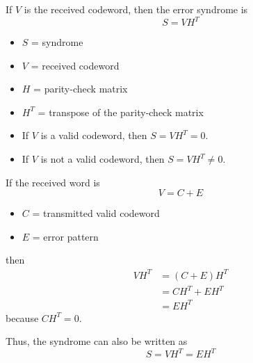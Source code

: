 \documentclass[11pt,a4paper]{book}
\newenvironment{formulabox}[1][Formula]{%
    \begin{tcolorbox}[
        enhanced,
        breakable,
        colback=softcoral!10,
        colframe=softcoral!200,
        title=#1,
        fonttitle=\bfseries,
        coltitle=white,
        sharp corners,
        boxrule=1pt,
        left=8pt,
        right=8pt,
        top=6pt,
        bottom=6pt
    ]
}{\end{tcolorbox}}
\begin{document}
\begin{formulabox}[Linear Code Error Syndrome]
If \(V\) is the received codeword, then the error syndrome is
\[
S=VH^T
\]
\begin{itemize}
    \item \(S\) = syndrome
    \item \(V\) = received codeword
    \item \(H\) = parity-check matrix
    \item \(H^T\) = transpose of the parity-check matrix
    \item If \(V\) is a valid codeword, then \(S = VH^T = 0\).
    \item If \(V\) is not a valid codeword, then \(S = VH^T \ne 0\).
\end{itemize}
\par\vspace{\baselineskip}
If the received word is
\[
V=C+E
\]
\begin{itemize}
    \item \(C\) = transmitted valid codeword
    \item \(E\) = error pattern
\end{itemize}
\par\vspace{\baselineskip}
then
\begin{align*}
VH^T &= (C+E)H^T\\
     &= CH^T+EH^T\\
     &= EH^T
\end{align*}
because \(CH^T=0\).
\par\vspace{\baselineskip}
Thus, the syndrome can also be written as
\[
S=VH^T=EH^T
\]
\end{formulabox}
\end{document}
